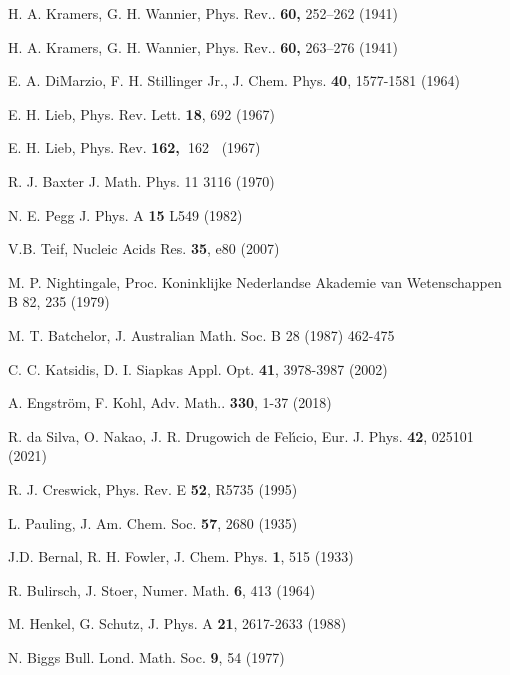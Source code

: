 \documentclass[3p, 10pt, onecolumn]{elsarticle}
\begin{document}
\begin{thebibliography}{99}
 H. A. Kramers, G. H. Wannier, Phys. Rev.. \textbf{60, }%
252--262 (1941)

 H. A. Kramers, G. H. Wannier, Phys. Rev.. \textbf{60, }%
263--276 (1941)

 E. A. DiMarzio, F. H. Stillinger Jr., J. Chem. Phys. 
\textbf{40}, 1577-1581 (1964)

 E. H. Lieb, Phys. Rev. Lett. \textbf{18}, 692 (1967)

 E. H. Lieb, Phys. Rev. \textbf{{162}\thinspace ,\ }162%
\textbf{\ }(1967)

 R. J. Baxter J. Math. Phys. 11 3116 (1970)

 N. E. Pegg J. Phys. A \textbf{15} L549 (1982) \textbf{\ }

 V.B. Teif, Nucleic Acids Res. \textbf{35}, e80 (2007)

 M. P. Nightingale, Proc. Koninklijke Nederlandse
Akademie van Wetenschappen B 82, 235 (1979)

 M. T. Batchelor, J. Australian Math. Soc. B 28 (1987)
462-475

 C. C. Katsidis, D. I. Siapkas Appl. Opt. \textbf{41},
3978-3987 (2002)

 A. Engstr\"{o}m, F. Kohl, Adv. Math.. \textbf{330},
1-37 (2018)

 R. da Silva, O. Nakao, J. R. Drugowich de Fel\'{\i}cio, 
Eur. J. Phys. \textbf{42}, 025101 (2021)

 R. J. Creswick, Phys. Rev. E \textbf{52}, R5735 (1995)

 L. Pauling, J. Am. Chem. Soc. \textbf{57}, 2680 (1935)

 J.D. Bernal, R. H. Fowler, J. Chem. Phys. \textbf{1}, 515
(1933)

 R. Bulirsch, J. Stoer, Numer. Math. \textbf{6}, 413 (1964)

 M. Henkel, G. Schutz, J. Phys. A \textbf{21}, 2617-2633
(1988)

 N. Biggs Bull. Lond. Math. Soc. \textbf{9}, 54 (1977)
\end{thebibliography}
\end{document}
